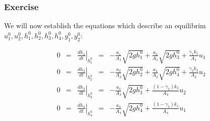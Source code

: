 \subsubsection{Exercise} 

We will now establish the equations which describe an equilibrim $u_1^0,u_2^0,h_1^0,h_2^0,h_3^0,h_4^0,y_1^0,y_2^0$:

$$
        \begin{array}{rcccl}
    0 & = & \left.\frac{dh_1}{dt}\right|_{h_1^0} & = &
            - \frac{a_1}{A_1}\sqrt{2gh_1^0} + \frac{a_3}{A_1}\sqrt{2gh_3^0} + \frac{\gamma_1k_1}{A_1}u_1\\ 

    0 & = & \left.\frac{dh_2}{dt}\right|_{h_2^0} & = &
            - \frac{a_2}{A_2}\sqrt{2gh_2^0} + \frac{a_4}{A_2}\sqrt{2gh_4^0} + \frac{\gamma_2k_2}{A_2}u_2\\ 

    0 & = & \left.\frac{dh_3}{dt}\right|_{h_3^0} & = &
            -\frac{a_3}{A_3}\sqrt{2gh_3^0}+\frac{(1-\gamma_2)k_2}{A_3}u_2 \\ 

    0 & = & \left.\frac{dh_4}{dt}\right|_{h_4^0} & = &
            -\frac{a_4}{A_4}\sqrt{2gh_4^0}+\frac{(1-\gamma_1)k_1}{A_4}u_1 \\ 
        \end{array}
$$
